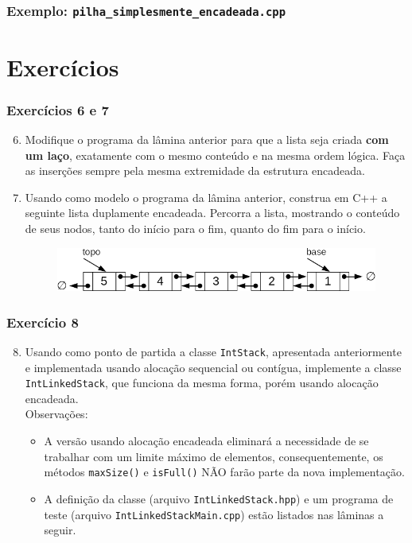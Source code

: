 \documentclass[aspectratio=169]{beamer}
\begin{document}
\begin{frame}[fragile]\frametitle{Exemplo: \texttt{pilha\_simplesmente\_encadeada.cpp}}
\fontsize{5pt}{5pt}\selectfont{

}
\end{frame}

\section{Exercícios}

\begin{frame}[fragile]\frametitle{Exercícios 6 e 7}
\begin{enumerate}
        \setcounter{enumi}{5}
	\item Modifique o programa da lâmina anterior para que a lista seja criada \textbf{com um laço}, exatamente com o mesmo conteúdo e na mesma ordem lógica. Faça as inserções sempre pela mesma extremidade da estrutura encadeada.
	\item Usando como modelo o programa da lâmina anterior, construa em C++ a seguinte lista duplamente encadeada. Percorra a lista, mostrando o conteúdo de seus nodos, tanto do início para o fim, quanto do fim para o início.	
\begin{figure}[h]
	\centering
	\includegraphics[height=0.16\paperheight]{imagens/pilha_duplamente_encadeada.png}
\end{figure}
\end{enumerate}
\end{frame}

\begin{frame}[fragile]\frametitle{Exercício 8}
\begin{enumerate}
        \setcounter{enumi}{7}
	\item Usando como ponto de partida a classe \texttt{IntStack}, apresentada anteriormente e implementada usando alocação sequencial ou contígua, implemente a classe \texttt{IntLinkedStack}, que funciona da mesma forma, porém usando alocação encadeada.\\
	Observações:
	\begin{itemize}
		\item A versão usando alocação encadeada eliminará a necessidade de se trabalhar com um limite máximo de elementos, consequentemente, os métodos \texttt{maxSize()} e \texttt{isFull()} NÃO farão parte da nova implementação.
		\item A definição da classe (arquivo \texttt{IntLinkedStack.hpp}) e um programa de teste (arquivo \texttt{IntLinkedStackMain.cpp}) estão listados nas lâminas a seguir.
	\end{itemize}
\end{enumerate}
\end{frame}
\end{document}
